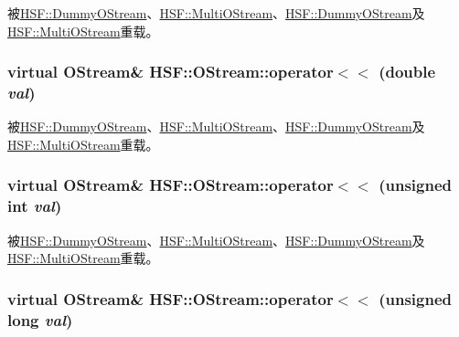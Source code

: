 被\hyperlink{classHSF_1_1DummyOStream_af27eca0aa6a04ff2a0e86bc668d88dcd}{HSF::DummyOStream}、\hyperlink{classHSF_1_1MultiOStream_ac926ea2605959066ab85c45a58dfa229}{HSF::MultiOStream}、\hyperlink{classHSF_1_1DummyOStream_af27eca0aa6a04ff2a0e86bc668d88dcd}{HSF::DummyOStream}及\hyperlink{classHSF_1_1MultiOStream_ac926ea2605959066ab85c45a58dfa229}{HSF::MultiOStream}重载。\hypertarget{classHSF_1_1OStream_a8c3d22e78a10c990e136c1514dfc99c6}{
\subsubsection[{operator$<$$<$}]{\setlength{\rightskip}{0pt plus 5cm}virtual {\bf OStream}\& HSF::OStream::operator$<$$<$ (double {\em val})}}
\label{classHSF_1_1OStream_a8c3d22e78a10c990e136c1514dfc99c6}


被\hyperlink{classHSF_1_1DummyOStream_a727be32ccd88ccaee0fae2e8d148e9b5}{HSF::DummyOStream}、\hyperlink{classHSF_1_1MultiOStream_a5655da107161e680d3ae6eadb35e6617}{HSF::MultiOStream}、\hyperlink{classHSF_1_1DummyOStream_a727be32ccd88ccaee0fae2e8d148e9b5}{HSF::DummyOStream}及\hyperlink{classHSF_1_1MultiOStream_a5655da107161e680d3ae6eadb35e6617}{HSF::MultiOStream}重载。\hypertarget{classHSF_1_1OStream_aa0cd93dd86633a0603d09d35e20c9520}{
\subsubsection[{operator$<$$<$}]{\setlength{\rightskip}{0pt plus 5cm}virtual {\bf OStream}\& HSF::OStream::operator$<$$<$ (unsigned int {\em val})}}
\label{classHSF_1_1OStream_aa0cd93dd86633a0603d09d35e20c9520}


被\hyperlink{classHSF_1_1DummyOStream_a9a138ca0d1ea4ebc7b3d699391bb3635}{HSF::DummyOStream}、\hyperlink{classHSF_1_1MultiOStream_a62badc16d7c2ac1ec092032698202938}{HSF::MultiOStream}、\hyperlink{classHSF_1_1DummyOStream_a9a138ca0d1ea4ebc7b3d699391bb3635}{HSF::DummyOStream}及\hyperlink{classHSF_1_1MultiOStream_a62badc16d7c2ac1ec092032698202938}{HSF::MultiOStream}重载。\hypertarget{classHSF_1_1OStream_ae4edb4f375ace6dab22021629c29a24f}{
\subsubsection[{operator$<$$<$}]{\setlength{\rightskip}{0pt plus 5cm}virtual {\bf OStream}\& HSF::OStream::operator$<$$<$ (unsigned long {\em val})}}
\label{classHSF_1_1OStream_ae4edb4f375ace6dab22021629c29a24f}


